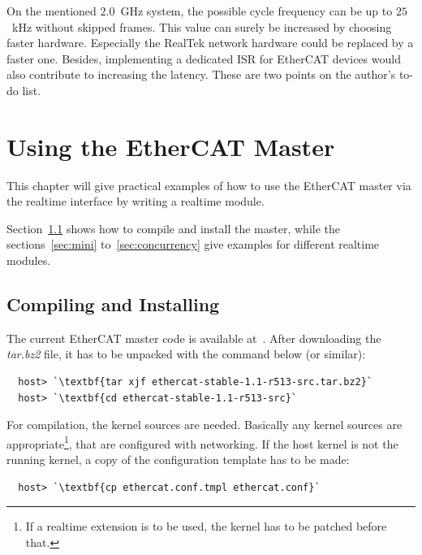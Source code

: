 \documentclass[a4paper,12pt,BCOR6mm,bibtotoc,idxtotoc]{scrbook}
\begin{document}
On the mentioned $2.0$~GHz system, the possible cycle frequency can be
up to $25$~kHz without skipped frames. This value can surely be
increased by choosing faster hardware. Especially the RealTek network
hardware could be replaced by a faster one. Besides, implementing a
dedicated ISR for EtherCAT devices would also contribute to increasing
the latency. These are two points on the author's to-do list.


\chapter{Using the EtherCAT Master}
\label{chapter:usage}

This chapter will give practical examples of how to use the EtherCAT
master via the realtime interface by writing a realtime module.

Section~\ref{sec:make} shows how to compile and install the master,
while the sections~\ref{sec:mini} to~\ref{sec:concurrency} give
examples for different realtime modules.


\section{Compiling and Installing}
\label{sec:make}

The current EtherCAT master code is available at~\cite{etherlab}.
After downloading the \textit{tar.bz2} file, it has to be unpacked
with the command below (or similar):

\begin{lstlisting}
  host> `\textbf{tar xjf ethercat-stable-1.1-r513-src.tar.bz2}`
  host> `\textbf{cd ethercat-stable-1.1-r513-src}`
\end{lstlisting}

For compilation, the kernel sources are needed. Basically any kernel
sources are appropriate\footnote{If a realtime extension is to be
  used, the kernel has to be patched before that.}, that are
configured with networking. If the host kernel is not the running
kernel, a copy of the configuration template has to be made:

\begin{lstlisting}
  host> `\textbf{cp ethercat.conf.tmpl ethercat.conf}`
\end{lstlisting}
\end{document}
